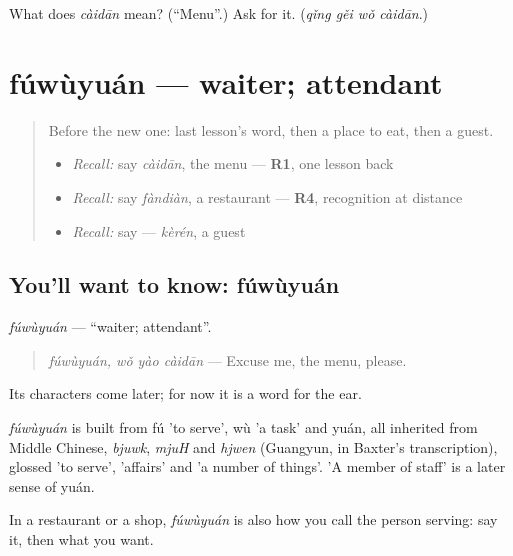 \begin{tcolorbox}[breakable,colback=teal!4,colframe=teal!35!black,title={Before you move on}]
What does \emph{càidān} mean? (\textquotedblleft{}Menu\textquotedblright{}.) Ask for it. (\emph{qǐng gěi wǒ càidān}.)
\end{tcolorbox}
\section[fúwùyuán]{fúwùyuán — waiter; attendant}

\label{lesson:ZH-C92-fuwuyuan}



\begin{quote}
Before the new one: last lesson's word, then a place to eat, then a guest.

\begin{itemize}
\raggedright
  \item \emph{Recall:} say \emph{càidān}, the menu — \textbf{R1}, one lesson back
  \item \emph{Recall:} say \emph{fàndiàn}, a restaurant — \textbf{R4}, recognition at distance
  \item \emph{Recall:} say  — \emph{kèrén}, a guest
\end{itemize}
\end{quote}

\subsection*{You'll want to know: fúwùyuán}
\emph{fúwùyuán} — \textquotedblleft{}waiter; attendant\textquotedblright{}.

\begin{quote}
\emph{fúwùyuán, wǒ yào càidān} — Excuse me, the menu, please.
\end{quote}

Its characters come later; for now it is a word for the ear.

\begin{cousinweb}
\emph{fúwùyuán} is built from fú 'to serve', wù 'a task' and yuán, all inherited from Middle Chinese, \emph{bjuwk}, \emph{mjuH} and \emph{hjwen} (Guangyun, in Baxter's transcription), glossed 'to serve', 'affairs' and 'a number of things'. 'A member of staff' is a later sense of yuán.
\end{cousinweb}

\begin{grammarlens}[title={What you've built}]
In a restaurant or a shop, \emph{fúwùyuán} is also how you call the person serving: say it, then what you want.
\end{grammarlens}

